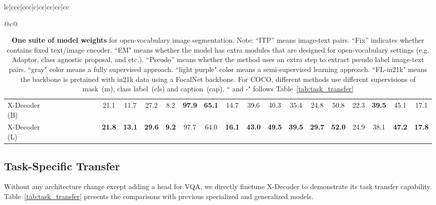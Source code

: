 \documentclass[10pt,twocolumn,letterpaper]{article}
\newcommand{\ourmodel}{X-Decoder}
\begin{document}
\begin{table*}[!ht]
{\begin{tabular}{lc|ccc|ccc|c|cc|cc|cc|cc}
{\begin{tabular}[c]{@{}c@{}}
\begin{table*}
{\begin{tabular}{lccccccc|cccccccccccccccc}
\rowcolor[rgb]{0.937,0.937,0.937} X-Decoder (B)        & \cmark & \cmark   & \cmark                    & \cmark                    & \xmark                    & \xmark                   & \xmark                                                                  & 21.1                                     & 11.7                                     & 27.2          & 8.2                                     & \textbf{97.9}                            & \textbf{65.1} & 14.7          & 39.6          & 40.3          & 35.4          & 24.8          & 50.8          & 22.3                                     & \textbf{39.5}                            & 45.1          & 17.1           \\
\rowcolor[rgb]{0.937,0.937,0.937} X-Decoder (L)        & \cmark & \cmark   & \cmark                    & \cmark                    & \xmark                    & \xmark                   & \xmark                                                                  & \textbf{21.8}                            & \textbf{13.1}                            & \textbf{29.6} & \textbf{9.2}                                     & 97.7                                     & 64.0          & \textbf{16.1}          & \textbf{43.0} & \textbf{49.5} & \textbf{39.5} & \textbf{29.7} & \textbf{52.0} & 24.9                                     & 38.1                                     & \textbf{47.2} & \textbf{17.8}  \\
\bottomrule
\end{tabular}
}
\vspace{3pt}
\caption{\textbf{One suite of model weights} for open-vocabulary image segmentation. Note: ``ITP'' means image-text pairs. ``Fix'' indicates whether contains fixed text/image encoder. ``EM" means whether the model has extra modules that are designed for open-vocabulary settings (e.g. Adaptor, class agnostic proposal, and etc.). ``Pseudo'' means whether the method uses an extra step to extract pseudo label image-text pairs. ``gray" color means a fully supervised approach. ``light purple" color means a semi-supervised learning approach. ``FL-in21k" means the backbone is pretained with in21k data using a FocalNet backbone. For COCO, different methods use different supervisions of mask~(m), class label~(cls) and caption~(cap). `` and -" follows Table~\ref{tab:task_transfer}}
\label{tab:zero-shot-transfer}
\end{table*} \vspace{-2pt}
\subsection{Task-Specific Transfer}
\label{exp:task_specific}
Without any architecture change except adding a head for VQA, we directly finetune \ourmodel{} to demonstrate its task transfer capability. Table~\ref{tab:task_transfer} presents the comparisons with previous specialized and generalized models.



\end{tabular}}
\end{tabular}}
\end{table*}
\end{document}
